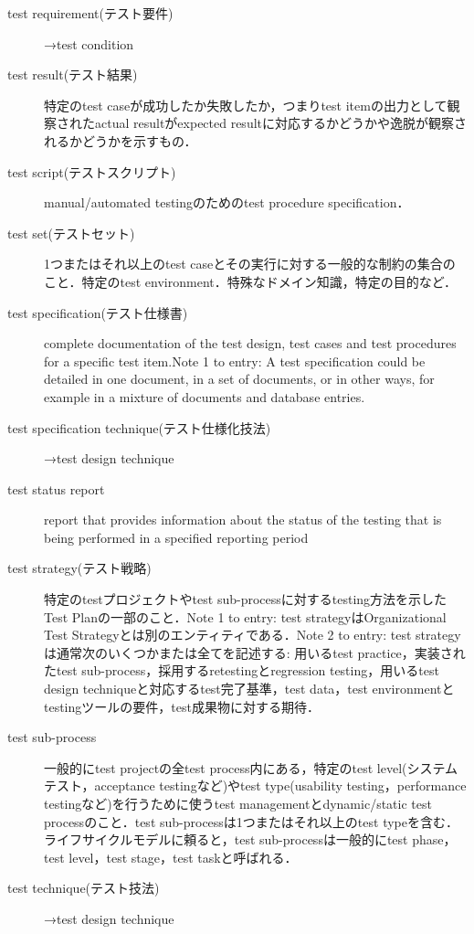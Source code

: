 \begin{description}
    \item[test requirement(テスト要件)]→test condition
    \item[test result(テスト結果)]特定のtest caseが成功したか失敗したか，つまりtest itemの出力として観察されたactual resultがexpected resultに対応するかどうかや逸脱が観察されるかどうかを示すもの．
    \item[test script(テストスクリプト)]manual/automated testingのためのtest procedure specification．
    \item[test set(テストセット)]1つまたはそれ以上のtest caseとその実行に対する一般的な制約の集合のこと．特定のtest environment．特殊なドメイン知識，特定の目的など．
    \item[test specification(テスト仕様書)]complete documentation of the test design, test cases and test procedures for a specific test item.Note 1 to entry: A test specification could be detailed in one document, in a set of documents, or in other ways, for example in a mixture of documents and database entries.
    \item[test specification technique(テスト仕様化技法)]→test design technique
    \item[test status report]report that provides information about the status of the testing that is being performed in a specified reporting period
    \item[test strategy(テスト戦略)]特定のtestプロジェクトやtest sub-processに対するtesting方法を示したTest Planの一部のこと．Note 1 to entry: test strategyはOrganizational Test Strategyとは別のエンティティである．Note 2 to entry: test strategyは通常次のいくつかまたは全てを記述する: 用いるtest practice，実装されたtest sub-process，採用するretestingとregression testing，用いるtest design techniqueと対応するtest完了基準，test data，test environmentとtestingツールの要件，test成果物に対する期待．
    \item[test sub-process]一般的にtest projectの全test process内にある，特定のtest level(システムテスト，acceptance testingなど)やtest type(usability testing，performance testingなど)を行うために使うtest managementとdynamic/static test processのこと．test sub-processは1つまたはそれ以上のtest typeを含む．ライフサイクルモデルに頼ると，test sub-processは一般的にtest phase，test level，test stage，test taskと呼ばれる．
    \item[test technique(テスト技法)]→test design technique

\end{description}
